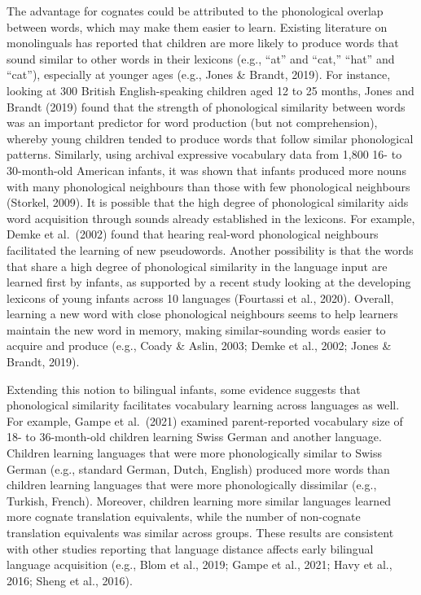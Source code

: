 \documentclass[
  english,
  ,man,floatsintext]{apa6}
\begin{document}
The advantage for cognates could be attributed to the phonological overlap between words, which may make them easier to learn. Existing literature on monolinguals has reported that children are more likely to produce words that sound similar to other words in their lexicons (e.g., ``at'' and ``cat,'' ``hat'' and ``cat''), especially at younger ages (e.g., Jones \& Brandt, 2019). For instance, looking at 300 British English-speaking children aged 12 to 25 months, Jones and Brandt (2019) found that the strength of phonological similarity between words was an important predictor for word production (but not comprehension), whereby young children tended to produce words that follow similar phonological patterns. Similarly, using archival expressive vocabulary data from 1,800 16- to 30-month-old American infants, it was shown that infants produced more nouns with many phonological neighbours than those with few phonological neighbours (Storkel, 2009). It is possible that the high degree of phonological similarity aids word acquisition through sounds already established in the lexicons. For example, Demke et al.~(2002) found that hearing real-word phonological neighbours facilitated the learning of new pseudowords. Another possibility is that the words that share a high degree of phonological similarity in the language input are learned first by infants, as supported by a recent study looking at the developing lexicons of young infants across 10 languages (Fourtassi et al., 2020). Overall, learning a new word with close phonological neighbours seems to help learners maintain the new word in memory, making similar-sounding words easier to acquire and produce (e.g., Coady \& Aslin, 2003; Demke et al., 2002; Jones \& Brandt, 2019).

Extending this notion to bilingual infants, some evidence suggests that phonological similarity facilitates vocabulary learning across languages as well. For example, Gampe et al.~(2021) examined parent-reported vocabulary size of 18- to 36-month-old children learning Swiss German and another language. Children learning languages that were more phonologically similar to Swiss German (e.g., standard German, Dutch, English) produced more words than children learning languages that were more phonologically dissimilar (e.g., Turkish, French). Moreover, children learning more similar languages learned more cognate translation equivalents, while the number of non-cognate translation equivalents was similar across groups. These results are consistent with other studies reporting that language distance affects early bilingual language acquisition (e.g., Blom et al., 2019; Gampe et al., 2021; Havy et al., 2016; Sheng et al., 2016).
\end{document}
